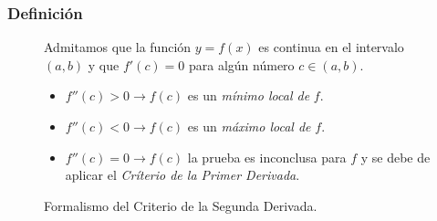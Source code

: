 \documentclass[letterpaper, 12pt]{article}
\begin{document}
    \subsubsection{Definición}
    \begin{figure}[H]
    \justify
    Admitamos que la función \(y=f(x)\) es continua en el intervalo \((a,b)\) y que \(f'(c)=0\) para algún número \(c\in (a,b)\).\\
    \begin{itemize}
        \item \(f''(c)>0\rightarrow f(c)\) es un \emph{mínimo local de} \(f\).
        \item \(f''(c)<0\rightarrow f(c)\) es un \emph{máximo local de} \(f\).
        \item \(f''(c)=0\rightarrow f(c)\) la prueba es inconclusa para \(f\) y se debe de aplicar el \emph{Críterio de la Primer Derivada}.
    \end{itemize}
    \caption{Formalismo del Criterio de la Segunda Derivada.}
    \label{fig:criterio}
    \end{figure}
\end{document}
